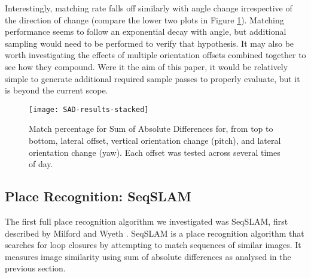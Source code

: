 \documentclass[letterpaper, 10 pt, conference]{ieeeconf}  %
\begin{document}
Interestingly, matching rate falls off similarly with angle change irrespective of the direction of change (compare the lower two plots in Figure \ref{fig:sad-results-stacked}). Matching performance seems to follow an exponential decay with angle, but additional sampling would need to be performed to verify that hypothesis. It may also be worth investigating the effects of multiple orientation offsets combined together to see how they compound. Were it the aim of this paper, it would be relatively simple to generate additional required sample passes to properly evaluate, but it is beyond the current scope.

\begin{figure}[h]
    \texttt{[image: SAD-results-stacked]}
    \caption{Match percentage for Sum of Absolute Differences for, from top to bottom, lateral offset, vertical orientation change (pitch), and lateral orientation change (yaw). Each offset was tested across several times of day.}
    \label{fig:sad-results-stacked}
\end{figure}




\subsection{Place Recognition: SeqSLAM}

The first full place recognition algorithm we investigated was SeqSLAM, first described by Milford and Wyeth \cite{Milford2012}. SeqSLAM is a place recognition algorithm that searches for loop closures by attempting to match sequences of similar images. It measures image similarity using sum of absolute differences as analysed in the previous section.
\end{document}
